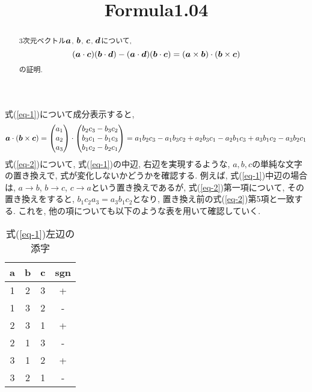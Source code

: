 \documentclass{jsarticle}
\title{Formula1.04}
\newcommand*{\mbold}[1]{\mbox{\boldmath $#1$}}
\begin{document}
\maketitle
\begin{abstract}
  3次元ベクトル$\mbold{a}$, $\mbold{b}$, $\mbold{c}$, $\mbold{d}$について, 
  \begin{equation}\label{eq-1}
    (\mbold{a} \cdot \mbold{c})(\mbold{b} \cdot \mbold{d}) 
    -(\mbold{a} \cdot \mbold{d})(\mbold{b} \cdot \mbold{c}) 
    = (\mbold{a} \times \mbold{b}) \cdot (\mbold{b} \times \mbold{c}) 
  \end{equation}
  の証明. 
\end{abstract}


式(\ref{eq-1})について成分表示すると, 
\begin{equation}\label{eq-2}
  \mbold{a} \cdot (\mbold{b} \times \mbold{c}) = 
  \begin{pmatrix}
        a_1 \\
        a_2 \\
        a_3
  \end{pmatrix}
  \cdot
  \begin{pmatrix}
    b_2 c_3 - b_3 c_2 \\
    b_3 c_1 - b_1 c_3 \\
    b_1 c_2 - b_2 c_1
  \end{pmatrix}
  = a_1 b_2 c_3 - a_1 b_3 c_2 + a_2 b_3 c_1 - a_2 b_1 c_3 + a_3 b_1 c_2 - a_3 b_2 c_1
\end{equation}
式(\ref{eq-2})について, 式(\ref{eq-1})の中辺, 右辺を実現するような, $a, b, c$の単純な文字の置き換えで, 式が変化しないかどうかを確認する. 
例えば, 式(\ref{eq-1})中辺の場合は, $a \rightarrow b$, $b \rightarrow c$, $c \rightarrow a$という置き換えであるが, 式(\ref{eq-2})第一項について, その置き換えをすると, $b_1 c_2 a_3 = a_3 b_1 c_2$となり, 置き換え前の式(\ref{eq-2})第5項と一致する. これを, 他の項についても以下のような表を用いて確認していく. 
\begin{table}[hbtp]
  \caption{式(\ref{eq-1})左辺の添字}
  \centering
  \begin{tabular}{|c|c|c|c|}
    \hline
    a & b & c & sgn \\
    \hline \hline
    1 & 2 & 3 & + \\
    \hdashline
    \rowcolor{yellow}1 & 3 & 2 & - \\
    \hdashline
    \rowcolor{green}2 & 3 & 1 & + \\
    \hdashline
    \rowcolor{red}2 & 1 & 3 & - \\
    \hdashline
    \rowcolor{cyan}3 & 1 & 2 & + \\
    \hdashline
    \rowcolor{magenta}3 & 2 & 1 & - \\
    \hline
  \end{tabular}
\end{table}
\end{document}
